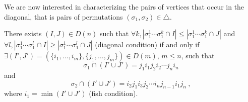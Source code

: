 We are now interested in characterizing the pairs of vertices that occur in the diagonal, that is pairs of permutations $(\sigma_1,\sigma_2) \in \triangle$. 

\begin{theorem} There exists $(I,J) \in D(n)$ such that $\forall k, |\sigma_1^1\cdots\sigma_1^k \cap I| \leq |\sigma_1^1\cdots\sigma_1^k \cap J|$ and $\forall l, |\sigma_1^1\cdots\sigma_1^l \cap I| \geq |\sigma_1^1\cdots\sigma_1^l \cap J|$ (diagonal condition) if and only if $\exists (I',J')=(\{i_1,\ldots,i_m\},\{j_1,\ldots,j_m\}) \in D(m)$, $m\leq n$, such that \[\sigma_1 \cap (I'\cup J')=j_1 i_1 j_2 i_2 \cdots j_n i_n \] and \[ \sigma_2 \cap (I'\cup J') = i_2 j_1 i_3 j_2 \cdots i_n j_{n-1} i_1 j_n \ , \] where $i_1 = \min (I' \cup J')$ (fish condition). 
\end{theorem}

